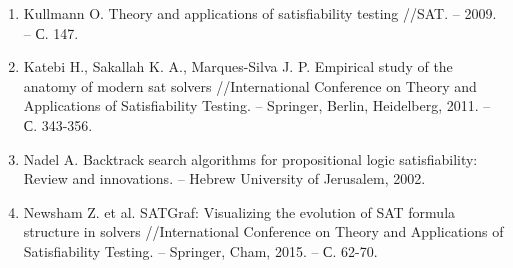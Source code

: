 \begin{enumerate}[label=\arabic{*}.]
\item
Kullmann O. Theory and applications of satisfiability testing //SAT. – 2009. – С. 147.

\item
Katebi H., Sakallah K. A., Marques-Silva J. P. Empirical study of the anatomy of modern sat solvers //International Conference on Theory and Applications of Satisfiability Testing. – Springer, Berlin, Heidelberg, 2011. – С. 343-356.

\item
Nadel A. Backtrack search algorithms for propositional logic satisfiability: Review and innovations. – Hebrew University of Jerusalem, 2002.


\item
Newsham Z. et al. SATGraf: Visualizing the evolution of SAT formula structure in solvers //International Conference on Theory and Applications of Satisfiability Testing. – Springer, Cham, 2015. – С. 62-70.

\end{enumerate}